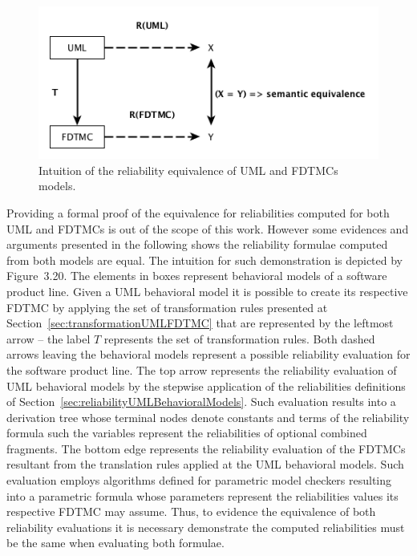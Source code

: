 \begin{figure}[h!]
\centering
\includegraphics[scale=0.5]{./img/reliabilityEquivalenceIntuition}
\caption{Intuition of the reliability equivalence of UML and FDTMCs models.} 
\label{fig:equivalenceIntuition2}
\end{figure}


Providing a formal proof of the equivalence for reliabilities computed for both
UML and FDTMCs is out of the scope of this work. However some evidences and
arguments presented in the following shows the reliability formulae computed
from both models are equal.  The intuition for such demonstration is depicted
by Figure~3.20.  The elements in boxes represent
behavioral models of a software product line.  Given a UML behavioral model it
is possible to create its respective FDTMC by applying the set of
transformation rules presented at Section~\ref{sec:transformationUMLFDTMC} that
are represented by the leftmost arrow -- the label $T$ represents the set of
transformation rules.  Both dashed arrows leaving the behavioral models
represent a possible reliability evaluation for the software product line.  The
top arrow represents the reliability evaluation of UML behavioral models by the
stepwise application of the reliabilities definitions of
Section~\ref{sec:reliabilityUMLBehavioralModels}. Such evaluation results into
a derivation tree whose terminal nodes denote constants and terms of the
reliability formula such the variables represent the reliabilities of optional
combined fragments.  The bottom edge represents the reliability evaluation of
the FDTMCs resultant from the translation rules applied at the UML behavioral
models.  Such evaluation employs algorithms defined for parametric model
checkers\cite{daws_pmc} resulting into a parametric formula whose parameters
represent the reliabilities values its respective FDTMC may assume.  Thus, to
evidence the equivalence of both reliability evaluations it is necessary
demonstrate the computed reliabilities must be the same when evaluating both
formulae. 


